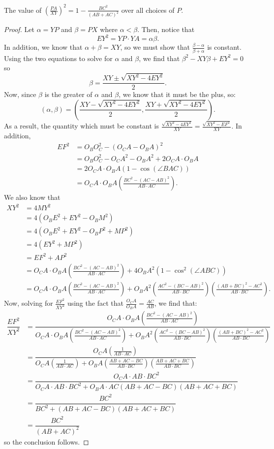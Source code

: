 \documentclass{article}
\begin{document}
\begin{claim*}
The value of $\left(\tfrac{PA}{XY}\right)^2 = 1-\tfrac{BC^2}{(AB+AC)^2}$ over all choices of $P$.
\end{claim*}
\begin{proof}
Let $\alpha = YP$ and $\beta = PX$ where $\alpha < \beta$. Then, notice that \[EY^2 = YP\cdot YA = \alpha\beta.\] In addition, we know that $\alpha+\beta = XY$, so we must show that $\tfrac{\beta-\alpha}{\beta+\alpha}$ is constant. Using the two equations to solve for $\alpha$ and $\beta$, we find that $\beta^2-XY\beta+EY^2 = 0$ so \[\beta = \dfrac{XY\pm\sqrt{XY^2-4EY^2}}{2}.\] Now, since $\beta$ is the greater of $\alpha$ and $\beta$, we know that it must be the plus, so: \[(\alpha, \beta) = \left(\dfrac{XY-\sqrt{XY^2-4EY^2}}{2},\dfrac{XY+\sqrt{XY^2-4EY^2}}{2}\right).\] As a result, the quantity which must be constant is $\tfrac{\sqrt{XY^2-4EY^2}}{XY} = \tfrac{\sqrt{XY^2-EF^2}}{XY}$. In addition,
\begin{align*}
EF^2 &= O_BO_C^2-(O_CA-O_BA)^2 \\
&= O_BO_C^2-O_CA^2-O_BA^2+2O_CA\cdot O_BA \\
&= 2O_CA\cdot O_BA(1-\cos(\angle BAC)) \\
&= O_CA\cdot O_BA\left(\tfrac{BC^2-(AC-AB)^2}{AB\cdot AC}\right).
\end{align*}
We also know that
\begin{align*}
XY^2 &= 4MY^2 \\
&= 4(O_BE^2+EY^2-O_BM^2) \\
&= 4(O_BE^2+EY^2-O_BP^2+MP^2) \\
&= 4(EY^2+MP^2) \\
&= EF^2+AP^2 \\
&= O_CA\cdot O_BA\left(\tfrac{BC^2-(AC-AB)^2}{AB\cdot AC}\right)+4O_BA^2(1-\cos^2(\angle ABC)) \\
&= O_CA\cdot O_BA\left(\tfrac{BC^2-(AC-AB)^2}{AB\cdot AC}\right)+O_BA^2\left(\tfrac{AC^2-(BC-AB)^2}{AB\cdot BC}\right)\left(\tfrac{(AB+BC)^2-AC^2}{AB\cdot BC}\right).
\end{align*}
Now, solving for $\tfrac{EF^2}{XY^2}$ using the fact that $\tfrac{O_CA}{O_BA} = \tfrac{AC}{AB}$, we find that:
\begin{align*}
\dfrac{EF^2}{XY^2} &= \dfrac{O_CA\cdot O_BA\left(\tfrac{BC^2-(AC-AB)^2}{AB\cdot AC}\right)}{O_CA\cdot O_BA\left(\tfrac{BC^2-(AC-AB)^2}{AB\cdot AC}\right)+O_BA^2\left(\tfrac{AC^2-(BC-AB)^2}{AB\cdot BC}\right)\left(\tfrac{(AB+BC)^2-AC^2}{AB\cdot BC}\right)} \\
&= \dfrac{O_CA\left(\tfrac{1}{AB\cdot AC}\right)}{O_CA\left(\tfrac{1}{AB\cdot AC}\right)+O_BA\left(\tfrac{AB+AC-BC}{AB\cdot BC}\right)\left(\tfrac{AB+AC+BC}{AB\cdot BC}\right)} \\
&= \dfrac{O_CA\cdot AB\cdot BC^2}{O_CA\cdot AB\cdot BC^2+O_BA\cdot AC(AB+AC-BC)(AB+AC+BC)} \\
&= \dfrac{BC^2}{BC^2+(AB+AC-BC)(AB+AC+BC)} \\
&= \dfrac{BC^2}{(AB+AC)^2}
\end{align*}
so the conclusion follows.
\end{proof}
\end{document}
